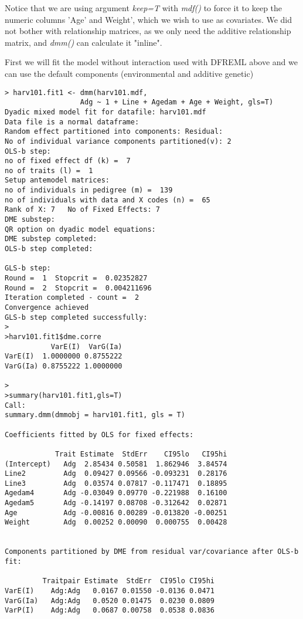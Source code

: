 \documentclass[titlepage]{article}  %
\begin{document}
Notice that we are using argument {\em keep=T} with {\em mdf()} to force it to keep the numeric columns 'Age' and Weight', which we wish to use as covariates. We did not bother with relationship matrices, as we only need the additive relationship matrix, and {\em dmm()} can calculate it "inline".

First we will fit the model without interaction used with DFREML above and we can use the default components (environmental and additive genetic)

\begin{verbatim}
> harv101.fit1 <- dmm(harv101.mdf,
                  Adg ~ 1 + Line + Agedam + Age + Weight, gls=T)
Dyadic mixed model fit for datafile: harv101.mdf  
Data file is a normal dataframe:
Random effect partitioned into components: Residual:
No of individual variance components partitioned(v): 2 
OLS-b step:
no of fixed effect df (k) =  7 
no of traits (l) =  1 
Setup antemodel matrices:
no of individuals in pedigree (m) =  139 
no of individuals with data and X codes (n) =  65 
Rank of X: 7   No of Fixed Effects: 7 
DME substep:
QR option on dyadic model equations:
DME substep completed:
OLS-b step completed:

GLS-b step:
Round =  1  Stopcrit =  0.02352827 
Round =  2  Stopcrit =  0.004211696 
Iteration completed - count =  2 
Convergence achieved
GLS-b step completed successfully:
>
>harv101.fit1$dme.corre
           VarE(I)  VarG(Ia)
VarE(I)  1.0000000 0.8755222
VarG(Ia) 0.8755222 1.0000000

>
>summary(harv101.fit1,gls=T)
Call:
summary.dmm(dmmobj = harv101.fit1, gls = T)

Coefficients fitted by OLS for fixed effects:

            Trait Estimate  StdErr    CI95lo   CI95hi
(Intercept)   Adg  2.85434 0.50581  1.862946  3.84574
Line2         Adg  0.09427 0.09566 -0.093231  0.28176
Line3         Adg  0.03574 0.07817 -0.117471  0.18895
Agedam4       Adg -0.03049 0.09770 -0.221988  0.16100
Agedam5       Adg -0.14197 0.08708 -0.312642  0.02871
Age           Adg -0.00816 0.00289 -0.013820 -0.00251
Weight        Adg  0.00252 0.00090  0.000755  0.00428


Components partitioned by DME from residual var/covariance after OLS-b fit:

         Traitpair Estimate  StdErr  CI95lo CI95hi
VarE(I)    Adg:Adg   0.0167 0.01550 -0.0136 0.0471
VarG(Ia)   Adg:Adg   0.0520 0.01475  0.0230 0.0809
VarP(I)    Adg:Adg   0.0687 0.00758  0.0538 0.0836



\end{verbatim}
\end{document}
